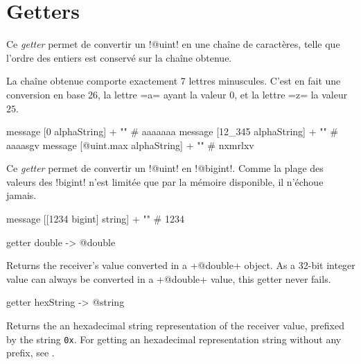 \section{Getters}


Ce \emph{getter} permet de convertir un \ggs!@uint! en une chaîne de caractères, telle que l'ordre des entiers est conservé sur la chaîne obtenue.

La chaîne obtenue comporte exactement 7 lettres minuscules. C'est en fait une conversion en base 26, la lettre \ggs=a= ayant la valeur $0$, et la lettre \ggs=z= la valeur $25$.


\begin{galgas}
  message [0 alphaString] + "\n"         # aaaaaaa
  message [12_345 alphaString] + "\n"    # aaaasgv
  message [@uint.max alphaString] + "\n" # nxmrlxv
\end{galgas}




Ce \emph{getter} permet de convertir un \ggs!@uint! en \ggs!@bigint!. Comme la plage des valeurs des \ggs!bigint! n'est limitée que par la mémoire disponible, il n'échoue jamais.

\begin{galgas}
  message [[1234 bigint] string] + "\n" # 1234
\end{galgas}



\begin{galgas}
getter double -> @double
\end{galgas}

Returns the receiver's value converted in a \ggs+@double+ object. As a 32-bit integer value can always be converted in a \ggs+@double+ value, this getter never fails.




\begin{galgas}
getter hexString -> @string
\end{galgas}

Returns the an hexadecimal string representation of the receiver value, prefixed by the string \texttt{0x}. For getting an hexadecimal representation string without any prefix, see .




